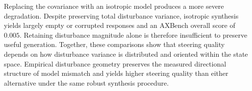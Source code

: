Replacing the covariance with an isotropic model produces a more severe
degradation. Despite preserving total disturbance variance, isotropic
synthesis yields largely empty or corrupted responses and an AXBench
overall score of $0.005$. Retaining disturbance magnitude alone is
therefore insufficient to preserve useful generation.
Together, these comparisons show that steering quality depends on how
disturbance variance is distributed and oriented within the state space.
Empirical disturbance geometry preserves the measured
directional structure of model mismatch and yields higher steering
quality than either alternative under the same robust synthesis procedure.
